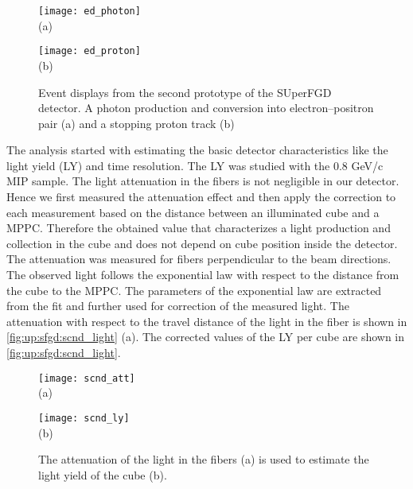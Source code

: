 \documentclass[main.tex]{subfiles}
\begin{document}
\begin{figure}[!ht]
	\centering
	\begin{minipage}{0.4\linewidth}
		\centering
		\texttt{[image: ed\_photon]} \\ (a)
	\end{minipage}
	\begin{minipage}{0.4\linewidth}
		\centering
		\texttt{[image: ed\_proton]} \\ (b)
	\end{minipage}
	\caption{Event displays from the second prototype of the SUperFGD detector. A photon production and conversion into electron--positron pair (a) and a stopping proton track (b)}
	\label{fig:up:sfgd:scnd_ed}
\end{figure}

The analysis started with estimating the basic detector characteristics like the light yield (LY) and time resolution. The LY was studied with the 0.8 GeV/c MIP sample. The light attenuation in the fibers is not negligible in our detector. Hence we first measured the attenuation effect and then apply the correction to each measurement based on the distance between an illuminated cube and a MPPC. Therefore the obtained value that characterizes a light production and collection in the cube and does not depend on cube position inside the detector. The attenuation was measured for fibers perpendicular to the beam directions. The observed light follows the exponential law with respect to the distance from the cube to the MPPC. The parameters of the exponential law are extracted from the fit and further used for correction of the measured light. The attenuation with respect to the travel distance of the light in the fiber is shown in \autoref{fig:up:sfgd:scnd_light} (a). The corrected values of the LY per cube are shown in \autoref{fig:up:sfgd:scnd_light}.

\begin{figure}[!ht]
	\centering
	\begin{minipage}{0.4\linewidth}
		\centering
		\texttt{[image: scnd\_att]} \\ (a)
	\end{minipage}
	\begin{minipage}{0.4\linewidth}
		\centering
		\texttt{[image: scnd\_ly]} \\ (b)
	\end{minipage}
	\caption{The attenuation of the light in the fibers (a) is used to estimate the light yield of the cube (b).}
	\label{fig:up:sfgd:scnd_light}
\end{figure}
\end{document}
